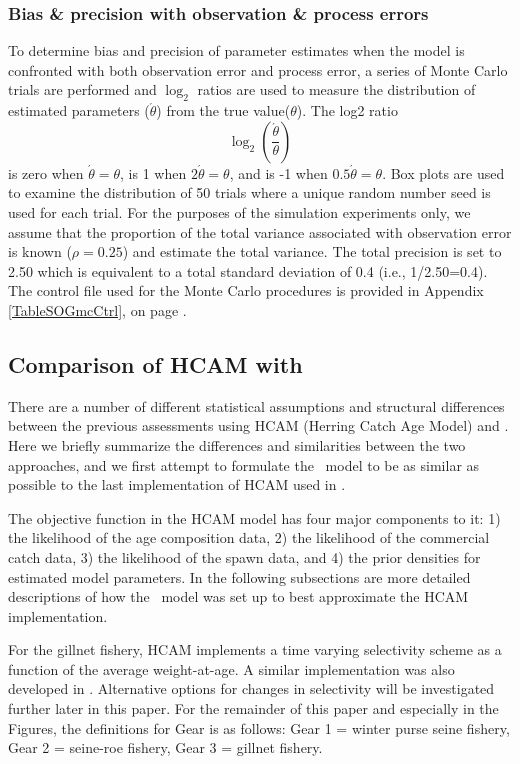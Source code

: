 		\subsubsection{Bias \& precision with observation \& process errors}
To determine bias and precision of parameter estimates when the model is confronted with both observation error and process error, a series of Monte Carlo trials are performed and $\log_2$ ratios are used to measure the distribution of estimated parameters ($\acute{\theta}$) from the true value($\theta$).  The log2 ratio
\[ \log_2\left(\frac{\acute{\theta}}{\theta}\right) \] is zero when $\acute{\theta}=\theta$, is 1 when $2\acute{\theta}=\theta$, and is -1 when $0.5\acute{\theta}=\theta$.  Box plots are used to examine the distribution of 50 trials where a unique random number seed is used for each trial.  For the purposes of the simulation experiments only, we assume that the proportion of the total variance associated with observation error is known ($\rho = 0.25$) and estimate the total variance.  The total precision is set to 2.50 which is equivalent to a total standard deviation of 0.4 (i.e., 1/2.50=0.4).  The control file used for the Monte Carlo procedures is provided in Appendix \ref{TableSOGmcCtrl}, on page \pageref{TableSOGmcCtrl}.


\subsection{Comparison of HCAM with \iscam}\label{secMethodsHCAM}
	
	There are a number of different statistical assumptions and structural differences between the previous assessments using HCAM (Herring Catch Age Model) and \iscam.	  Here we briefly summarize the differences and similarities between the two approaches, and we first attempt to formulate the \iscam\ model to be as similar as possible to the last implementation of HCAM used in \cite{Clear2010}.
	
	The objective function in the HCAM model has four major components to it: 1) the likelihood of the age composition data, 2) the likelihood of the commercial catch data, 3) the likelihood of the spawn data, and 4) the prior densities for estimated model parameters.  In the following subsections are more detailed descriptions of how the \iscam\ model was set up to best approximate the HCAM implementation.
	
	For the gillnet fishery, HCAM implements a time varying selectivity scheme as a function of the average weight-at-age. A similar implementation was also developed in \iscam. Alternative options for changes in selectivity will be investigated further later in this paper.  For the remainder of this paper and especially in the Figures, the definitions for Gear is as follows:  Gear 1 = winter purse seine fishery, Gear 2 = seine-roe fishery, Gear 3 = gillnet fishery.
	

